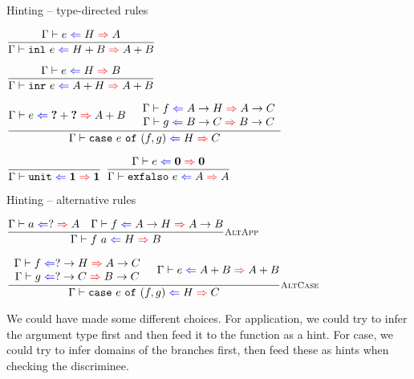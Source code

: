 \documentclass{beamer}
\newcommand{\Fun}[2]{#1 \to #2}
\newcommand{\Sum}[2]{#1 + #2}
\newcommand{\Unit}{\textbf{1}}
\newcommand{\Empty}{\textbf{0}}
\newcommand{\app}[2]{#1\ #2}
\newcommand{\inl}[1]{\texttt{inl}\ #1}
\newcommand{\inr}[1]{\texttt{inr}\ #1}
\newcommand{\case}[3]{\texttt{case}\ #1\ \texttt{of}\ (#2, #3)}
\newcommand{\unit}{\texttt{unit}}
\newcommand{\exfalso}[1]{\texttt{exfalso}\ #1}
\newcommand{\rulename}[1]{\textsc{\footnotesize{#1}}}
\newcommand{\infrule}[3][]{\displaystyle \frac{#2}{#3} \rulename{#1}}
\begin{document}
\begin{frame}{Hinting -- type-directed rules}

\begin{center}
  $\infrule{\hinting{e}{H}{A}}{\hinting{\inl{e}}{\Sum{H}{B}}{\Sum{A}{B}}}$

  \vspace{2em}

  $\infrule{\hinting{e}{H}{B}}{\hinting{\inr{e}}{\Sum{A}{H}}{\Sum{A}{B}}}$

  \vspace{2em}

  $\infrule{\hinting{e}{\Sum{\Hole}{\Hole}}{\Sum{A}{B}} \quad \begin{array}{c} \hinting{f}{\Fun{A}{H}}{\Fun{A}{C}} \\ \hinting{g}{\Fun{B}{C}}{\Fun{B}{C}} \end{array}}{\hinting{\case{e}{f}{g}}{H}{C}}$

  \vspace{2em}

  $\infrule{}{\hinting{\unit}{\Unit}{\Unit}}$ \quad
  $\infrule{\hinting{e}{\Empty}{\Empty}}{\hinting{\exfalso{e}}{A}{A}}$
\end{center}

\end{frame}

\begin{frame}{Hinting -- alternative rules}

\begin{center}
  $\infrule[AltApp]{\hinting{a}{?}{A} \quad \hinting{f}{\Fun{A}{H}}{\Fun{A}{B}}}{\hinting{\app{f}{a}}{H}{B}}$

  \vspace{2em}

  $\infrule[AltCase]{\begin{array}{c} \hinting{f}{\Fun{?}{H}}{\Fun{A}{C}} \\ \hinting{g}{\Fun{?}{C}}{\Fun{B}{C}} \end{array} \quad \hinting{e}{\Sum{A}{B}}{\Sum{A}{B}}}{\hinting{\case{e}{f}{g}}{H}{C}}$
\end{center}

\vspace{2em}

We could have made some different choices. For application, we could try to infer the argument type first and then feed it to the function as a hint. For case, we could try to infer domains of the branches first, then feed these as hints when checking the discriminee.

\end{frame}
\end{document}
